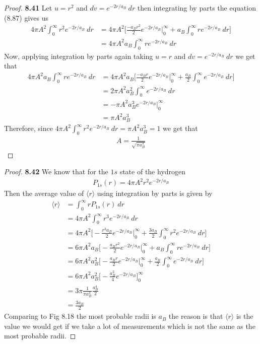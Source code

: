\documentclass[11pt]{article}
\theoremstyle{definition}
\begin{document}
\cleardoublepage
\begin{proof}{\textbf{8.41}}
Let $u = r^2$ and $dv = e^{-2r/a_B}~dr$ then integrating by parts the equation
(8.87) gives us
\begin{align*}
    4\pi A^2\int_0^\infty r^2e^{-2r/a_B}~dr &=
    4\pi A^2\bigg[\frac{-a_Br^2}{2}e^{-2r/a_B}\bigg|_0^\infty +
    a_B \int_0^\infty r e^{-2r/a_B}~dr \bigg]\\
    &= 4\pi A^2 a_B \int_0^\infty re^{-2r/a_B}~dr
\end{align*}
Now, applying integration by parts again taking $u = r$ and $dv =e^{-2r/a_B}~dr$
we get that
\begin{align*}
    4\pi A^2 a_B\int_0^\infty r e^{-2r/a_B}~dr &=
    4\pi A^2 a_B\bigg[\frac{-a_Br}{2}e^{-2r/a_B}\bigg|_0^\infty +
    \frac{a_B}{2} \int_0^\infty e^{-2r/a_B}~dr \bigg]\\
    &= 2\pi A^2a_B^2 \int_0^\infty e^{-2r/a_B}~dr\\
    &= -\pi A^2a_B^3 e^{-2r/a_B}\bigg|_0^\infty\\
    &= \pi A^2a_B^3
\end{align*}
Therefore, since $4\pi A^2\int_0^\infty r^2e^{-2r/a_B}~dr = \pi A^2a_B^3 = 1$ we get that
\begin{align*}
    A = \frac{1}{\sqrt{\pi a_B^3}}
\end{align*}
\end{proof}

\cleardoublepage
\begin{proof}{\textbf{8.42}}
We know that for the $1s$ state of the hydrogen
\begin{align*}
    P_{1s}(r) = 4\pi A^2r^2e^{-2r/a_B}
\end{align*}
Then the average value of $\langle r\rangle$ using integration by parts
is given by
\begin{align*}
    \langle r \rangle &= \int_0^\infty rP_{1s}(r)~dr\\
    &= 4\pi A^2\int_0^\infty r^3e^{-2r/a_B}~dr\\
    &= 4\pi A^2\bigg[
        -\frac{r^3a_B}{2}e^{-2r/a_B}\bigg|_0^\infty 
        + \frac{3a_B}{2}\int_0^\infty r^2 e^{-2r/a_B}~dr
    \bigg]\\
    &= 6\pi A^2a_B\bigg[
        -\frac{a_Br^2}{2}e^{-2r/a_B}\bigg|_0^\infty
        + a_B\int_0^\infty r e^{-2r/a_B}~dr
    \bigg]\\
    &= 6\pi A^2a_B^2\bigg[
        -\frac{a_Br}{2}e^{-2r/a_B}\bigg|_0^\infty
        + \frac{a_B}{2}\int_0^\infty e^{-2r/a_B}~dr
    \bigg]\\
    &= 6\pi A^2a_B^2\bigg[-\frac{a_B^2}{4} e^{-2r/a_B}\bigg]_0^\infty\\
    &= 3\pi \frac{1}{\pi a_B^3}\frac{a_B^4}{2}\\
    &= \frac{3a_B}{2}
\end{align*}
Comparing to Fig 8.18 the most probable radii is $a_B$ the reason is that
$\langle r \rangle$ is the value we would get if we take a lot of measurements
which is not the same as the most probable radii.
\end{proof}
\end{document}
